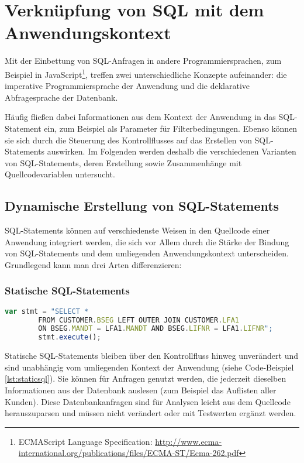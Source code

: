 \section{Verkn{\"u}pfung von SQL mit dem Anwendungskontext}\label{sec:dependencydetection}

%
%

Mit der Einbettung von SQL-Anfragen in andere Programmiersprachen, zum Beispiel in JavaScript\footnote{ECMAScript Language
Specification: \url{http://www.ecma-international.org/publications/files/ECMA-ST/Ecma-262.pdf}}, treffen zwei unterschiedliche Konzepte aufeinander: die imperative Programmiersprache der Anwendung und die deklarative Abfragesprache der Datenbank.

Häufig fließen dabei Informationen aus dem Kontext der Anwendung in das SQL-Statement ein, zum Beispiel als Parameter für Filterbedingungen.
Ebenso können sie sich durch die Steuerung des Kontrollflusses auf das Erstellen von SQL-Statements auswirken.
Im Folgenden werden deshalb die verschiedenen Varianten von SQL-Statements, deren Erstellung sowie Zusammenhänge mit Quellcodevariablen untersucht.

\subsection{Dynamische Erstellung von SQL-Statements}
SQL-Statements können auf verschiedenste Weisen in den Quellcode einer Anwendung integriert werden, die sich vor Allem durch die Stärke der Bindung von SQL-Statements und dem umliegenden Anwendungskontext unterscheiden.
Grundlegend kann man drei Arten differenzieren:

\subsubsection{Statische SQL-Statements}

	\begin{lstlisting}[caption={Statisches SQL-Statement eingebettet im Quellcode}, label={lst:staticsql}, language=JavaScript]
		var stmt = "SELECT *
		FROM CUSTOMER.BSEG LEFT OUTER JOIN CUSTOMER.LFA1
		ON BSEG.MANDT = LFA1.MANDT AND BSEG.LIFNR = LFA1.LIFNR";
		stmt.execute();
	\end{lstlisting}

Statische SQL-Statements bleiben über den Kontrollfluss hinweg unverändert und sind unabhängig vom umliegenden Kontext der Anwendung (siehe Code-Beispiel \ref{lst:staticsql}).
Sie können für Anfragen genutzt werden, die jederzeit dieselben Informationen aus der Datenbank auslesen (zum Beispiel das Auflisten aller Kunden).
Diese Datenbankanfragen sind für Analysen leicht aus dem Quellcode herauszuparsen und müssen nicht verändert oder mit Testwerten ergänzt werden.

